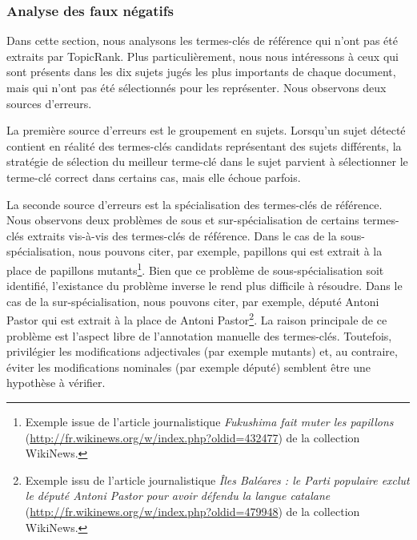         \subsubsection{Analyse des faux négatifs}
        \label{subsubsec:main-automatic_keyphrase_annotation-unsupervised_automatic_keyphrase_extraction-error_analysis-false_negatives}
          Dans cette section, nous analysons les termes-clés de référence qui
          n'ont pas été extraits par TopicRank. Plus particulièrement, nous nous
          intéressons à ceux qui sont présents dans les dix sujets jugés les
          plus importants de chaque document, mais qui n'ont pas été
          sélectionnés pour les représenter. Nous observons deux sources
          d'erreurs.

          La première source d'erreurs est le groupement en sujets. Lorsqu'un
          sujet détecté contient en réalité des termes-clés candidats
          représentant des sujets différents, la stratégie de sélection du
          meilleur terme-clé dans le sujet parvient à sélectionner le terme-clé
          correct dans certains cas, mais elle échoue parfois.

          La seconde source d'erreurs est la spécialisation des termes-clés de
          référence. Nous observons deux problèmes de sous et sur-spécialisation
          de certains termes-clés extraits vis-à-vis des termes-clés de
          référence. Dans le cas de la sous-spécialisation, nous pouvons citer,
          par exemple, \og{}papillons\fg{} qui est extrait à la place de
          \og{}papillons mutants\fg{}\footnote{Exemple issue de l'article
          journalistique \textit{Fukushima fait muter les papillons}
          (\url{http://fr.wikinews.org/w/index.php?oldid=432477}) de la
          collection WikiNews.}. Bien que ce problème de sous-spécialisation
          soit identifié, l'existance du problème inverse le rend plus difficile
          à résoudre. Dans le cas de la sur-spécialisation, nous pouvons citer,
          par exemple, \og{}député Antoni Pastor\fg{} qui est extrait à la place
          de \og{}Antoni Pastor\fg{}\footnote{Exemple issu de l'article
          journalistique \textit{Îles Baléares : le Parti populaire exclut le
          député Antoni Pastor pour avoir défendu la langue catalane}
          (\url{http://fr.wikinews.org/w/index.php?oldid=479948}) de la
          collection WikiNews.}. La raison principale de ce problème est
          l'aspect libre de l'annotation manuelle des termes-clés. Toutefois,
          privilégier les modifications adjectivales (par exemple
          \og{}mutants\fg{}) et, au contraire, éviter les modifications
          nominales (par exemple \og{}député\fg{}) semblent être une hypothèse à
          vérifier.

